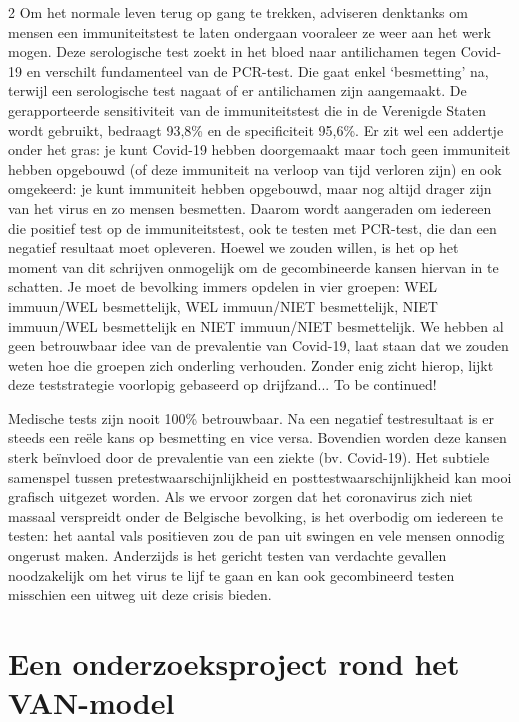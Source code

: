 \begin{multicols}{2}
Om het normale leven terug op gang te trekken, adviseren denktanks om mensen een immuniteitstest te laten ondergaan vooraleer ze weer aan het werk mogen. Deze serologische test zoekt in het bloed naar antilichamen tegen Covid-19 en verschilt fundamenteel van de PCR-test. Die gaat enkel ‘besmetting’ na, terwijl een serologische test nagaat of er antilichamen zijn aangemaakt. De gerapporteerde sensitiviteit van de immuniteitstest die in de Verenigde Staten wordt gebruikt, bedraagt 93,8\% en de specificiteit 95,6\%. Er zit wel een addertje onder het gras: je kunt Covid-19 hebben doorgemaakt maar toch geen immuniteit hebben opgebouwd (of deze immuniteit na verloop van tijd verloren zijn) en ook omgekeerd: je kunt immuniteit hebben opgebouwd, maar nog altijd drager zijn van het virus en zo mensen besmetten. Daarom wordt aangeraden om iedereen die positief test op de immuniteitstest, ook te testen met PCR-test, die dan een negatief resultaat moet opleveren. Hoewel we zouden willen, is het op het moment van dit schrijven onmogelijk om de gecombineerde kansen hiervan in te schatten. Je moet de bevolking immers opdelen in vier groepen: WEL immuun/WEL besmettelijk, WEL immuun/NIET besmettelijk, NIET immuun/WEL besmettelijk en NIET immuun/NIET besmettelijk. We hebben al geen betrouwbaar idee van de prevalentie van Covid-19, laat staan dat we zouden weten hoe die groepen zich onderling verhouden. Zonder enig zicht hierop, lijkt deze teststrategie voorlopig gebaseerd op drijfzand... To be continued!

Medische tests zijn nooit 100\% betrouwbaar. Na een negatief testresultaat is er steeds een reële kans op besmetting en vice versa. Bovendien worden deze kansen sterk beïnvloed door de prevalentie van een ziekte (bv. Covid-19). Het subtiele samenspel tussen pretestwaarschijnlijkheid en posttestwaarschijnlijkheid kan mooi grafisch uitgezet worden. Als we ervoor zorgen dat het coronavirus zich niet massaal verspreidt onder de Belgische bevolking, is het overbodig om iedereen te testen: het aantal vals positieven zou de pan uit swingen en vele mensen onnodig ongerust maken. Anderzijds is het gericht testen van verdachte gevallen noodzakelijk om het virus te lijf te gaan en kan ook gecombineerd testen misschien een uitweg uit deze crisis bieden. 





\section{Een onderzoeksproject rond het VAN-model}


\end{multicols}
